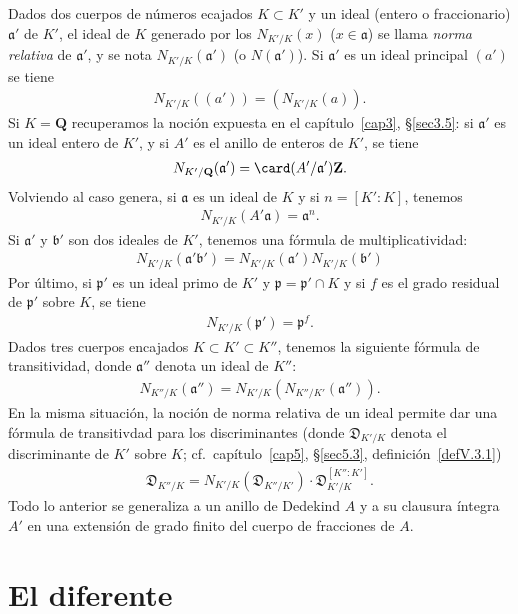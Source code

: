 \documentclass[bibtotoc,leqno,spanish]{amsbook}
\newcommand{\QQ}{\mathbf{Q}}
\newcommand{\ZZ}{\mathbf{Z}}
\newcommand{\idl}[1]{\mathfrak{#1}}
\newcommand{\disc}{\mathfrak{D}}
\numberwithin{equation}{section}
\theoremstyle{note}
\theoremstyle{note}
\theoremstyle{rem}
\numberwithin{theorem}{section}
\numberwithin{proposition}{section}
\numberwithin{definition}{section}
\numberwithin{lemma}{section}
\numberwithin{corollary}{section}
\numberwithin{example}{section}
\numberwithin{footnote}{section}%
\begin{document}
Dados dos cuerpos de n\'umeros ecajados $K\subset K'$ y un ideal (entero o fraccionario) $\idl{a}'$ de $K'$,
el ideal de $K$ generado por los $N_{K'/K}(x)$ ($x\in\idl{a}$) se llama {\em norma relativa} de $\idl{a}'$,
y se nota $N_{K'/K}(\idl{a}')$ (o $N(\idl{a}')$). Si $\idl{a}'$ es un ideal principal $(a')$ se tiene
\begin{gather}
N_{K'/K}((a')) = (N_{K'/K}(a)).
\end{gather}
Si $K=\QQ$ recuperamos la noci\'on expuesta en el cap\'itulo~\ref{cap3}, \S\ref{sec3.5}: si $\idl{a}'$ es un
ideal entero de $K'$, y si $A'$ es el anillo de enteros de $K'$, se tiene
\begin{gather}
N_{K'/\QQ}(\idl{a}') = \card(A'/\idl{a}')\ZZ.
\end{gather}
Volviendo al caso genera, si $\idl{a}$ es un ideal de $K$ y si $n=[K':K]$, tenemos
\begin{gather}
N_{K'/K}(A'\idl{a}) = \idl{a}^{n}.
\end{gather}
Si $\idl{a}'$ y $\idl{b}'$ son dos ideales de $K'$, tenemos una f\'ormula de multiplicatividad:
\begin{gather}
N_{K'/K}(\idl{a}'\idl{b}') = N_{K'/K}(\idl{a}')N_{K'/K}(\idl{b}')
\end{gather}
Por \'ultimo, si $\idl{p}'$ es un ideal primo de $K'$ y $\idl{p} = \idl{p}'\cap K$ y si $f$ es el grado
residual de $\idl{p}'$ sobre $K$, se tiene
\begin{gather}
N_{K'/K}(\idl{p}') = \idl{p}^{f}.
\end{gather}
Dados tres cuerpos encajados $K\subset K'\subset K''$, tenemos la siguiente f\'ormula de transitividad, donde
$\idl{a}''$ denota un ideal de $K''$:
\begin{gather}
N_{K''/K}(\idl{a}'') = N_{K'/K}(N_{K''/K'}(\idl{a}'')).
\end{gather}
En la misma situaci\'on, la noci\'on de norma relativa de un ideal permite dar una f\'ormula de transitivdad
para los discriminantes (donde $\disc_{K'/K}$ denota el discriminante de $K'$ sobre $K$;
cf.~cap\'itulo~\ref{cap5}, \S\ref{sec5.3}, definici\'on~\ref{defV.3.1})
\begin{gather}
\disc_{K''/K}=N_{K'/K}(\disc_{K''/K'})\cdot\disc_{K'/K}^{[K'':K']}.
\end{gather}
Todo lo anterior se generaliza a un anillo de Dedekind $A$ y a su clausura \'integra $A'$ en una extensi\'on
de grado finito del cuerpo de fracciones de $A$.

\section*{El diferente}
\end{document}
